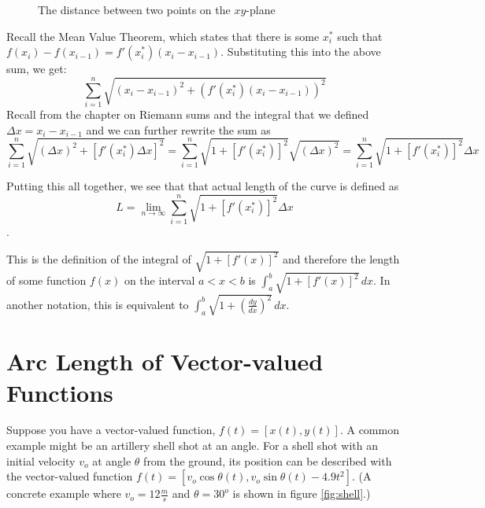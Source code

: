 \begin{figure}[htbp]
\centering
    \caption{The distance between two points on the $xy$-plane}
    \label{fig:distance}
\end{figure}

Recall the Mean Value Theorem, which states that there is some 
$x_i^{\text{*}}$ such that $f(x_i) - f(x_{i-1}) = f'(x_i^{\text{*}})
(x_i - x_{i-1})$. Substituting this into the above sum, we get: 
$$\sum_{i=1}^n \sqrt{(x_i - x_{i-1})^2 + (f'(x_i^{\text{*}})(x_i - x_{i-1}))^2}$$ 
Recall from the chapter on Riemann sums and the integral that we 
defined $\Delta x = x_i - x_{i-1}$ and we can further rewrite the 
sum as $$\sum_{i=1}^n \sqrt{(\Delta x)^2 + [f'(x_i^{\text{*}}) \Delta x]^2} 
= \sum_{i=1}^n \sqrt{1+[f'(x_i^{\text{*}})]^2}\sqrt{(\Delta x)^2} = 
\sum_{i=1}^n \sqrt{1+[f'(x_i^{\text{*}})]^2}\Delta x$$

Putting this all together, we see that that actual length of the 
curve is defined as $$L = \lim_{n \to \infty}\sum_{i=1}^n \sqrt{1+
[f'(x_i^{\text{*}})]^2}\Delta x$$.

This is the definition of the integral of $\sqrt{1+[f'(x)]^2}$ and 
therefore the length of some function $f(x)$ on the interval $a < x <b$ 
is $\int_a^b \sqrt{1 + [f'(x)]^2}\,dx$. In another notation, this is 
equivalent to $\int_a^b \sqrt{1 + (\frac{dy}{dx})^2}\,dx$. 

\section{Arc Length of Vector-valued Functions}
Suppose you have a vector-valued function, $f(t) = [x(t), y(t)]$. A 
common example might be an artillery shell shot at an angle. For a 
shell shot with an initial velocity $v_o$ at angle $\theta$ from the 
ground, its position can be described with the vector-valued function 
$f(t) = [v_o\cos{\theta}(t), v_o\sin{\theta}(t) - 4.9t^2]$. (A 
concrete example where $v_o = 12 \frac{m}{s}$ and $\theta = 30^o$ is 
shown in figure \ref{fig:shell}.)

